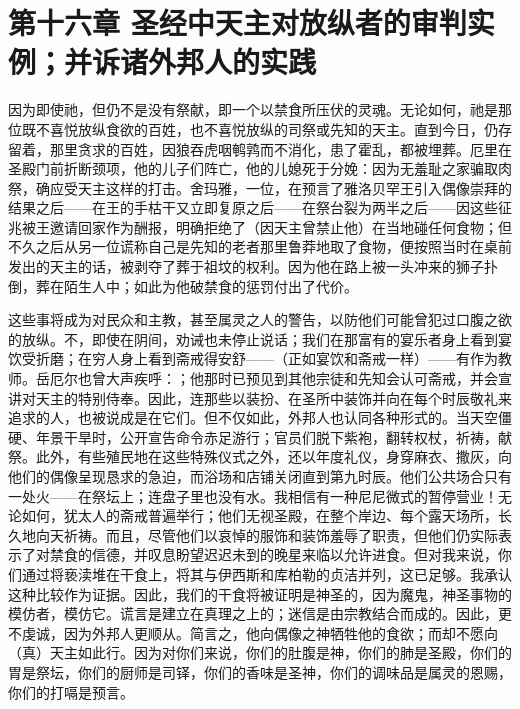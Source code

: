
\section{第十六章 圣经中天主对放纵者的审判实例；并诉诸外邦人的实践}

因为即使祂，但仍不是没有祭献，即一个以禁食所压伏的灵魂。无论如何，祂是那位既不喜悦放纵食欲的百姓，也不喜悦放纵的司祭或先知的天主。直到今日，仍存留着，那里贪求的百姓，因狼吞虎咽鹌鹑而不消化，患了霍乱，都被埋葬。厄里在圣殿门前折断颈项，他的儿子们阵亡，他的儿媳死于分娩：因为无羞耻之家骗取肉祭，确应受天主这样的打击。舍玛雅，一位，在预言了雅洛贝罕王引入偶像崇拜的结果之后——在王的手枯干又立即复原之后——在祭台裂为两半之后——因这些征兆被王邀请回家作为酬报，明确拒绝了（因天主曾禁止他）在当地碰任何食物；但不久之后从另一位谎称自己是先知的老者那里鲁莽地取了食物，便按照当时在桌前发出的天主的话，被剥夺了葬于祖坟的权利。因为他在路上被一头冲来的狮子扑倒，葬在陌生人中；如此为他破禁食的惩罚付出了代价。\par

这些事将成为对民众和主教，甚至属灵之人的警告，以防他们可能曾犯过口腹之欲的放纵。不，即使在阴间，劝诫也未停止说话；我们在那富有的宴乐者身上看到宴饮受折磨；在穷人身上看到斋戒得安舒——（正如宴饮和斋戒一样）——有作为教师。岳厄尔也曾大声疾呼：；他那时已预见到其他宗徒和先知会认可斋戒，并会宣讲对天主的特别侍奉。因此，连那些以装扮、在圣所中装饰并向在每个时辰敬礼来追求的人，也被说成是在它们。但不仅如此，外邦人也认同各种形式的。当天空僵硬、年景干旱时，公开宣告命令赤足游行；官员们脱下紫袍，翻转权杖，祈祷，献祭。此外，有些殖民地在这些特殊仪式之外，还以年度礼仪，身穿麻衣、撒灰，向他们的偶像呈现恳求的急迫，而浴场和店铺关闭直到第九时辰。他们公共场合只有一处火——在祭坛上；连盘子里也没有水。我相信有一种尼尼微式的暂停营业！无论如何，犹太人的斋戒普遍举行；他们无视圣殿，在整个岸边、每个露天场所，长久地向天祈祷。而且，尽管他们以哀悼的服饰和装饰羞辱了职责，但他们仍实际表示了对禁食的信德，并叹息盼望迟迟未到的晚星来临以允许进食。但对我来说，你们通过将亵渎堆在干食上，将其与伊西斯和库柏勒的贞洁并列，这已足够。我承认这种比较作为证据。因此，我们的干食将被证明是神圣的，因为魔鬼，神圣事物的模仿者，模仿它。谎言是建立在真理之上的；迷信是由宗教结合而成的。因此，更不虔诚，因为外邦人更顺从。简言之，他向偶像之神牺牲他的食欲；而却不愿向（真）天主如此行。因为对你们来说，你们的肚腹是神，你们的肺是圣殿，你们的胃是祭坛，你们的厨师是司铎，你们的香味是圣神，你们的调味品是属灵的恩赐，你们的打嗝是预言。\par

